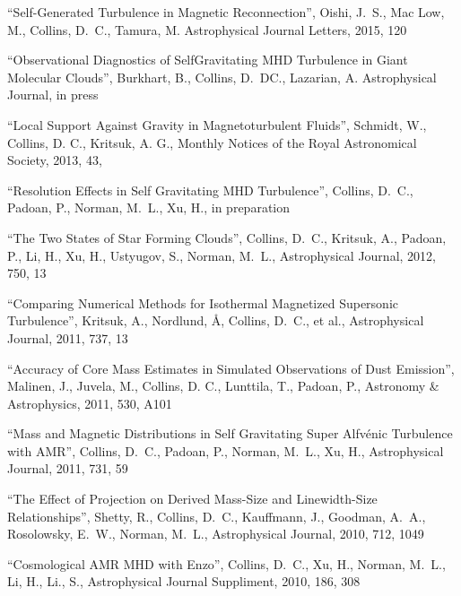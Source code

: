 \newcommand{\citeform}[1]{}

\medskip
\noindent
``Self-Generated Turbulence in Magnetic Reconnection'', {Oishi}, J.~S., {Mac
Low}, M., {Collins}, D.~C., Tamura, M.  Astrophysical Journal Letters, 2015, 120

\medskip
\noindent
``Observational Diagnostics of Self­Gravitating MHD Turbulence in Giant
Molecular Clouds'', {Burkhart}, B., {Collins}, D.~DC., {Lazarian}, A.
Astrophysical Journal, in press


\medskip
\noindent
``Local Support Against Gravity in Magnetoturbulent Fluids'',
Schmidt, W., Collins, D. C., Kritsuk, A. G.,
Monthly Notices of the Royal Astronomical Society, 2013, 43, 
\citeform{9}%

\medskip
\noindent
``Resolution Effects in Self Gravitating MHD Turbulence'', 
Collins, D.~C., Padoan, P., Norman, M.~L., Xu, H.,
in preparation

\medskip
\noindent
``The Two States of Star Forming Clouds'', 
Collins, D.~C., Kritsuk, A., Padoan, P., Li, H., Xu, H., Ustyugov, S., Norman, M.~L.,
Astrophysical Journal, 2012, 750, 13
\citeform{22}%


\medskip
\noindent
``Comparing Numerical
Methods for Isothermal Magnetized Supersonic Turbulence'', 
Kritsuk, A., Nordlund, \AA, Collins, D.~C., et al.,
Astrophysical Journal, 2011, 737, 13
\citeform{31}%

\medskip
\noindent
``Accuracy of Core Mass Estimates in Simulated Observations of Dust Emission'', 
Malinen, J., Juvela, M., Collins, D. C., Lunttila, T., Padoan, P.,
Astronomy \& Astrophysics, 2011, 530, A101
\citeform{27}%

\medskip
\noindent
``Mass and Magnetic Distributions in Self Gravitating Super Alfv\' enic Turbulence with AMR'', 
Collins, D.~C., Padoan, P., Norman, M.~L., Xu, H.,
Astrophysical Journal, 2011, 731, 59
\citeform{17}%

\medskip
\noindent
``The Effect of Projection on Derived Mass-Size and Linewidth-Size Relationships'', 
Shetty, R., Collins, D.~C.,  Kauffmann, J.,  Goodman, A.~A.,  Rosolowsky, E.~W.,  Norman, M.~L., 
Astrophysical Journal, 2010, 712, 1049
\citeform{29}%

\medskip
\noindent
``Cosmological AMR MHD with Enzo'', 
Collins, D.~C., Xu, H., Norman, M.~L., Li, H., Li., S.,
Astrophysical Journal Suppliment, 2010, 186, 308
\citeform{41}%

